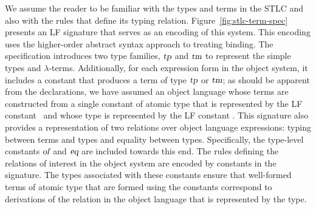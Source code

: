 We assume the reader to be familiar with the types and terms in the
STLC and also with the rules that define its typing relation.
%
Figure~\ref{fig:stlc-term-spec} presents an LF signature that serves as
an encoding of this system. 
%
This encoding uses the higher-order abstract syntax approach to
treating binding. 
%
The specification introduces two type families, $\mbox{\sl tp}$ and $\mbox{\sl tm}$ to 
represent the simple types and $\lambda$-terms.
%
Additionally, for each expression form in the object system, it
includes a constant that produces a term of type $\mbox{\sl tp}$ or $\mbox{\sl tm}$;
as should be apparent from the declarations, we have assumed an object
language whose terms are constructed from a single constant of
atomic type that is represented by the LF constant \emptytm\ and whose
type is represented by the LF constant \unittm.
%
This signature also provides a representation of two relations over
object language expressions: typing between terms and types and
equality between types. 
%
Specifically, the type-level constants $\mbox{\sl of}$ and $\mbox{\sl eq}$ are
included towards this end. 
%
The rules defining the relations of interest in the object system are
encoded by constants in the signature.
%
The types associated with these constants ensure that well-formed
terms of atomic type that are formed using the constants correspond to
derivations of the relation in the object language that is represented
by the type. 

